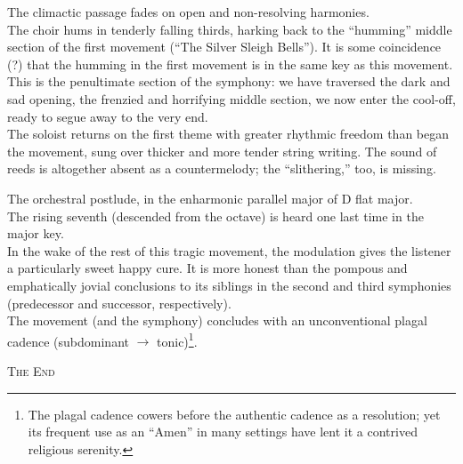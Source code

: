 \documentclass{beamer}
\begin{document}
\begin{frame}
  The climactic passage fades on open and non-resolving harmonies. 
  \pause \\
  The choir hums in tenderly falling thirds, harking back to the ``humming'' middle section of the first movement (``The Silver Sleigh Bells''). It is some coincidence (?) that the humming in the first movement is in the same key as this movement. 
  \pause \\
  This is the penultimate section of the symphony: we have traversed the dark and sad opening, the frenzied and horrifying middle section, we now enter the cool-off, ready to segue away to the very end. 
  \pause \\
  The soloist returns on the first theme with greater rhythmic freedom than began the movement, sung over thicker and more tender string writing. The sound of reeds is altogether absent as a countermelody; the ``slithering,'' too, is missing. 
\end{frame} 

\begin{frame}
  The orchestral postlude, in the enharmonic parallel major of D flat major. 
  \pause \\
  The rising seventh (descended from the octave) is heard one last time in the major key. 
  \pause \\ 
  In the wake of the rest of this tragic movement, the modulation gives the listener a particularly sweet happy cure. It is more honest than the pompous and emphatically jovial conclusions to its siblings in the second and third symphonies (predecessor and successor, respectively). 
  \pause \\
  The movement (and the symphony) concludes with an unconventional plagal cadence (subdominant \(\to\) tonic)\footnote{The plagal cadence cowers before the authentic cadence as a resolution; yet its frequent use as an ``Amen'' in many settings have lent it a contrived religious serenity.}. 
\end{frame} 

\begin{frame}
  \begin{center} 
    {\Large\textsc{The End} }
  \end{center} 
\end{frame} 
\end{document}
